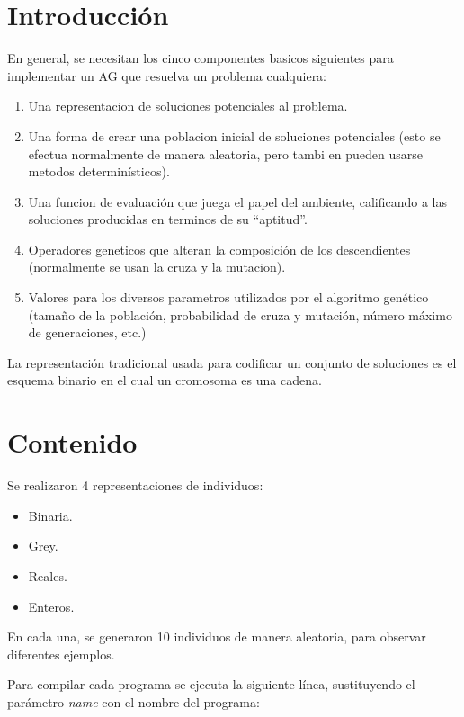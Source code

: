 \documentclass[11pt,letterpaper]{article}
\begin{document}


\section*{Introducción}
En general, se necesitan los cinco componentes basicos siguientes para
implementar un AG que resuelva un problema cualquiera:

\begin{enumerate}
	\item Una representacion de soluciones potenciales al problema.
	\item Una forma de crear una poblacion inicial de soluciones potenciales (esto
	se efectua normalmente de manera aleatoria, pero tambi en pueden usarse
	metodos determinísticos).
	\item Una funcion de evaluación que juega el papel del ambiente, calificando a
	las soluciones producidas en terminos de su “aptitud”.
	\item Operadores geneticos que alteran la composición de los descendientes (normalmente se usan la cruza y la mutacion).
	\item Valores para los diversos parametros utilizados por el algoritmo genético
	(tamaño de la población, probabilidad de cruza y mutación, número máximo
	de generaciones, etc.)
\end{enumerate}

La representación tradicional usada para codificar un conjunto de soluciones es el esquema binario en el cual un cromosoma es una cadena. 

\section*{Contenido}

Se realizaron 4 representaciones de individuos:
\begin{itemize}
	\item Binaria.
	\item Grey.
	\item Reales.
	\item Enteros.
\end{itemize}

En cada una, se generaron 10 individuos de manera aleatoria, para observar diferentes ejemplos.

Para compilar cada programa se ejecuta la siguiente línea, sustituyendo el parámetro \textit{name} con el nombre del programa:
\end{document}
